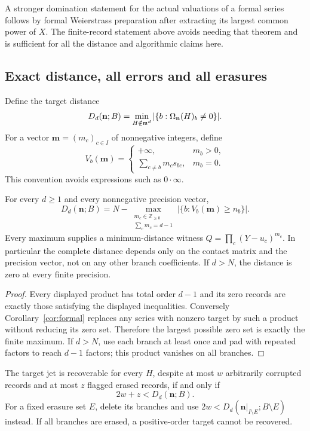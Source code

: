 \begin{remark}
A stronger domination statement for the actual valuations of a formal series
follows by formal Weierstrass preparation after extracting its largest common
power of $X$. The finite-record statement above avoids needing that theorem
and is sufficient for all the distance and algorithmic claims here.
\end{remark}

\subsection{Exact distance, all errors and all erasures}

Define the target distance
\[
 D_d(\mathbf n;B)=\min_{H\notin\mathfrak m^d}
       |\{b:\Omega_{\mathbf n}(H)_b\ne0\}|.
\]
For a vector $\mathbf m=(m_c)_{c\in I}$ of nonnegative integers, define
\[
 V_b(\mathbf m)=
 \begin{cases}
 +\infty,&m_b>0,\\
 \displaystyle\sum_{c\ne b}m_cs_{bc},&m_b=0.
 \end{cases}
\]
This convention avoids expressions such as $0\cdot\infty$.

\begin{theorem}\label{thm:distance}
For every $d\ge1$ and every nonnegative precision vector,
\[
 \boxed{\quad D_d(\mathbf n;B)=N-
 \max_{\substack{m_c\in\mathbb Z_{\ge0}\\\sum_cm_c=d-1}}
    |\{b:V_b(\mathbf m)\ge n_b\}|.\quad}
\]
Every maximum supplies a minimum-distance witness
$Q=\prod_c(Y-u_c)^{m_c}$. In particular the complete distance depends only on
the contact matrix and the precision vector, not on any other branch
coefficients. If $d>N$, the distance is zero at every finite precision.
\end{theorem}

\begin{proof}
Every displayed product has total order $d-1$ and its zero records are exactly
those satisfying the displayed inequalities. Conversely
Corollary~\ref{cor:formal} replaces any series with nonzero target by such a
product without reducing its zero set. Therefore the largest possible zero
set is exactly the finite maximum. If $d>N$, use each branch at least once
and pad with repeated factors to reach $d-1$ factors; this product vanishes
on all branches.
\end{proof}

\begin{corollary}\label{cor:errors}
The target jet is recoverable for every $H$, despite at most $w$ arbitrarily
corrupted records and at most $z$ flagged erased records, if and only if
\[
 2w+z<D_d(\mathbf n;B).
\]
For a fixed erasure set $E$, delete its branches and use
$2w<D_d(\mathbf n|_{I\setminus E};B\setminus E)$ instead.
If all branches are erased, a positive-order target cannot be recovered.
\end{corollary}

